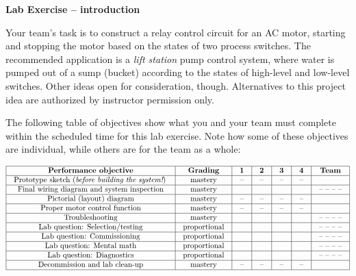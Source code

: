 

\noindent
{\bf Lab Exercise -- introduction}

\vskip 5pt

Your team's task is to construct a relay control circuit for an AC motor, starting and stopping the motor based on the states of two process switches.  The recommended application is a {\it lift station} pump control system, where water is pumped out of a sump (bucket) according to the states of high-level and low-level switches.  Other ideas open for consideration, though.  Alternatives to this project idea are authorized by instructor permission only.

The following table of objectives show what you and your team must complete within the scheduled time for this lab exercise.  Note how some of these objectives are individual, while others are for the team as a whole:



$$\vbox{\offinterlineskip
\halign{\strut
\vrule \quad\hfil # \ \hfil & 
\vrule \quad\hfil # \ \hfil & 
\vrule \quad\hfil # \ \hfil & 
\vrule \quad\hfil # \ \hfil & 
\vrule \quad\hfil # \ \hfil & 
\vrule \quad\hfil # \ \hfil & 
\vrule \quad\hfil # \ \hfil \vrule \cr
\noalign{\hrule}
%
{\bf Performance objective} & {\bf Grading} & {\bf 1} & {\bf 2} & {\bf 3} & {\bf 4} & {\bf Team} \cr
%
\noalign{\hrule}
%
Prototype sketch ({\it before building the system!}) & mastery & -- & -- & -- & -- & \cr
%
\noalign{\hrule}
%
Final wiring diagram and system inspection & mastery & & & & & -- -- -- -- \cr
%
\noalign{\hrule}
%
Pictorial (layout) diagram & mastery & -- & -- & -- & -- &  \cr
%
\noalign{\hrule}
%
Proper motor control function & mastery & -- & -- & -- & -- &  \cr
%
\noalign{\hrule}
%
Troubleshooting & mastery & & & & & -- -- -- -- \cr
%
\noalign{\hrule}
%
Lab question: Selection/testing & proportional &  &  &  &  & -- -- -- -- \cr
%
\noalign{\hrule}
%
Lab question: Commissioning & proportional &  &  &  &  & -- -- -- -- \cr
%
\noalign{\hrule}
%
Lab question: Mental math & proportional &  &  &  &  & -- -- -- -- \cr
%
\noalign{\hrule}
%
Lab question: Diagnostics & proportional &  &  &  &  & -- -- -- -- \cr
%
\noalign{\hrule}
%
Decommission and lab clean-up & mastery & -- & -- & -- & -- &  \cr
%
\noalign{\hrule}
} %
}$$ %

